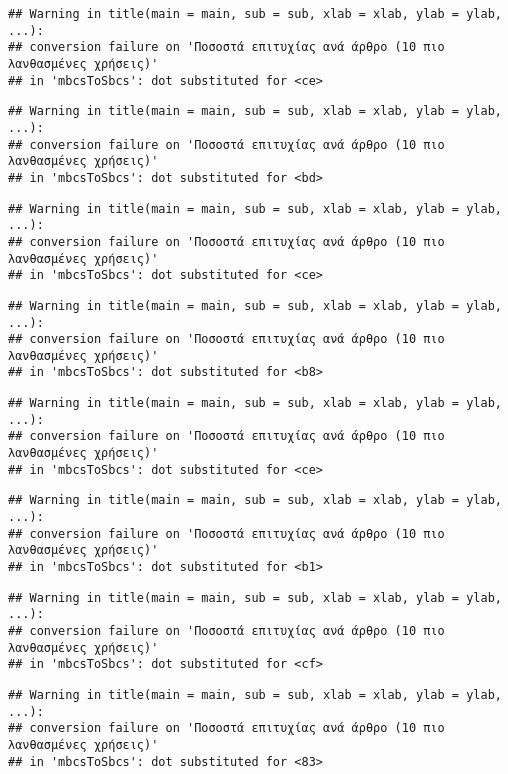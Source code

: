 \documentclass[
]{article}
\begin{document}
\begin{verbatim}
## Warning in title(main = main, sub = sub, xlab = xlab, ylab = ylab, ...):
## conversion failure on 'Ποσοστά επιτυχίας ανά άρθρο (10 πιο λανθασμένες χρήσεις)'
## in 'mbcsToSbcs': dot substituted for <ce>
\end{verbatim}

\begin{verbatim}
## Warning in title(main = main, sub = sub, xlab = xlab, ylab = ylab, ...):
## conversion failure on 'Ποσοστά επιτυχίας ανά άρθρο (10 πιο λανθασμένες χρήσεις)'
## in 'mbcsToSbcs': dot substituted for <bd>
\end{verbatim}

\begin{verbatim}
## Warning in title(main = main, sub = sub, xlab = xlab, ylab = ylab, ...):
## conversion failure on 'Ποσοστά επιτυχίας ανά άρθρο (10 πιο λανθασμένες χρήσεις)'
## in 'mbcsToSbcs': dot substituted for <ce>
\end{verbatim}

\begin{verbatim}
## Warning in title(main = main, sub = sub, xlab = xlab, ylab = ylab, ...):
## conversion failure on 'Ποσοστά επιτυχίας ανά άρθρο (10 πιο λανθασμένες χρήσεις)'
## in 'mbcsToSbcs': dot substituted for <b8>
\end{verbatim}

\begin{verbatim}
## Warning in title(main = main, sub = sub, xlab = xlab, ylab = ylab, ...):
## conversion failure on 'Ποσοστά επιτυχίας ανά άρθρο (10 πιο λανθασμένες χρήσεις)'
## in 'mbcsToSbcs': dot substituted for <ce>
\end{verbatim}

\begin{verbatim}
## Warning in title(main = main, sub = sub, xlab = xlab, ylab = ylab, ...):
## conversion failure on 'Ποσοστά επιτυχίας ανά άρθρο (10 πιο λανθασμένες χρήσεις)'
## in 'mbcsToSbcs': dot substituted for <b1>
\end{verbatim}

\begin{verbatim}
## Warning in title(main = main, sub = sub, xlab = xlab, ylab = ylab, ...):
## conversion failure on 'Ποσοστά επιτυχίας ανά άρθρο (10 πιο λανθασμένες χρήσεις)'
## in 'mbcsToSbcs': dot substituted for <cf>
\end{verbatim}

\begin{verbatim}
## Warning in title(main = main, sub = sub, xlab = xlab, ylab = ylab, ...):
## conversion failure on 'Ποσοστά επιτυχίας ανά άρθρο (10 πιο λανθασμένες χρήσεις)'
## in 'mbcsToSbcs': dot substituted for <83>
\end{verbatim}
\end{document}
